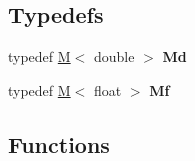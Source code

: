 \subsection*{Typedefs}
\begin{DoxyCompactItemize}
\item 
\mbox{\label{namespacecpyp_a0774a5221fcde0758d5631809691da50}} 
typedef \mbox{\hyperlink{structcpyp_1_1_m}{M}}$<$ double $>$ {\bfseries Md}
\item 
\mbox{\label{namespacecpyp_a791741f59f467a3cb5e8c0e81fd3c44a}} 
typedef \mbox{\hyperlink{structcpyp_1_1_m}{M}}$<$ float $>$ {\bfseries Mf}
\end{DoxyCompactItemize}
\subsection*{Functions}
